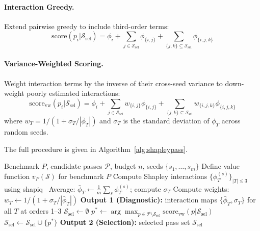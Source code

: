 \documentclass[preprint]{article}
\newcommand{\shapval}{\phi}
\newcommand{\passset}{\mathcal{S}}
\newcommand{\allpasses}{\mathcal{P}}
\newcommand{\valfn}{v}
\begin{document}
\paragraph{Interaction Greedy.} Extend pairwise greedy to include third-order terms:
\begin{equation}
    \text{score}(p_i | \passset_{\text{sel}}) = \shapval_i + \sum_{j \in \passset_{\text{sel}}} \shapval_{\{i,j\}} + \sum_{\{j,k\} \subseteq \passset_{\text{sel}}} \shapval_{\{i,j,k\}}
\end{equation}

\paragraph{Variance-Weighted Scoring.} Weight interaction terms by the inverse of their cross-seed variance to down-weight poorly estimated interactions:
\begin{equation}
    \text{score}_{\text{vw}}(p_i | \passset_{\text{sel}}) = \shapval_i + \sum_{j \in \passset_{\text{sel}}} w_{\{i,j\}} \shapval_{\{i,j\}} + \sum_{\{j,k\} \subseteq \passset_{\text{sel}}} w_{\{i,j,k\}} \shapval_{\{i,j,k\}}
\end{equation}
where $w_T = 1 / (1 + \sigma_T / |\bar{\shapval}_T|)$ and $\sigma_T$ is the standard deviation of $\shapval_T$ across random seeds.

The full procedure is given in Algorithm~\ref{alg:shapleypass}.

\begin{algorithm}[t]
\caption{ShapleyPass: Interaction Analysis and Guided Pass Selection}
\label{alg:shapleypass}
\begin{algorithmic}[1]
\REQUIRE Benchmark $P$, candidate passes $\allpasses$, budget $n$, seeds $\{s_1, \ldots, s_m\}$
\STATE Define value function $\valfn_P(\passset)$ for benchmark $P$
    \STATE Compute Shapley interactions $\{\shapval_T^{(s)}\}_{|T| \leq 3}$ using shapiq~\citep{muschalik2024shapiq}
\ENDFOR
\STATE Average: $\bar{\shapval}_T \leftarrow \frac{1}{m}\sum_s \shapval_T^{(s)}$; compute $\sigma_T$
\STATE Compute weights: $w_T \leftarrow 1/(1 + \sigma_T / |\bar{\shapval}_T|)$
\STATE \textbf{Output 1 (Diagnostic):} interaction maps $\{\bar{\shapval}_T, \sigma_T\}$ for all $T$ at orders 1--3
\STATE $\passset_{\text{sel}} \leftarrow \emptyset$
    \STATE $p^* \leftarrow \arg\max_{p \in \allpasses \setminus \passset_{\text{sel}}} \text{score}_{\text{vw}}(p | \passset_{\text{sel}})$
    \STATE $\passset_{\text{sel}} \leftarrow \passset_{\text{sel}} \cup \{p^*\}$
\ENDFOR
\STATE \textbf{Output 2 (Selection):} selected pass set $\passset_{\text{sel}}$
\end{algorithmic}
\end{algorithm}
\end{document}

